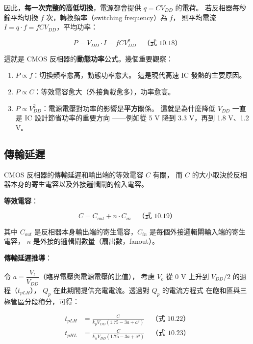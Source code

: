 \documentclass[12pt]{article}
\begin{document}
因此，\textbf{每一次完整的高低切換}，電源都會提供 $q = CV_{DD}$ 的電荷。
若反相器每秒鐘平均切換 $f$ 次，轉換頻率（switching frequency）為 $f$，
則平均電流 $I = q \cdot f = fCV_{DD}$，平均功率：

\begin{formulabox}
\[
  P = V_{DD} \cdot I = fCV_{DD}^2 \quad\text{（式 10.18）}
\]
\end{formulabox}

這就是 CMOS 反相器的\textbf{動態功率}公式。幾個重要觀察：

\begin{enumerate}[leftmargin=2.2em,itemsep=2pt]
  \item $P \propto f$：切換頻率愈高，動態功率愈大。
    這是現代高速 IC 發熱的主要原因。
  \item $P \propto C$：等效電容愈大（外接負載愈多），功率愈高。
  \item $P \propto V_{DD}^2$：電源電壓對功率的影響是\textbf{平方}關係。
    這就是為什麼降低 $V_{DD}$ 一直是 IC 設計節省功率的重要方向
    ——例如從 5 V 降到 3.3 V，再到 1.8 V、1.2 V。
\end{enumerate}

\subsection*{傳輸延遲}


CMOS 反相器的傳輸延遲和輸出端的等效電容 $C$ 有關，
而 $C$ 的大小取決於反相器本身的寄生電容以及外接邏輯閘的輸入電容。

\textbf{等效電容}：
\begin{formulabox}
\[
  C = C_{out} + n \cdot C_{in} \quad\text{（式 10.19）}
\]
\end{formulabox}
其中 $C_{out}$ 是反相器本身輸出端的寄生電容，$C_{in}$ 是每個外接邏輯閘輸入端的寄生電容，
$n$ 是外接的邏輯閘數量（扇出數，fanout）。

\textbf{傳輸延遲推導}：

令 $a = \dfrac{V_t}{V_{DD}}$（臨界電壓與電源電壓的比值），
考慮 $V_o$ 從 $0$ V 上升到 $V_{DD}/2$ 的過程（$t_{pLH}$），
$Q_p$ 在此期間提供充電電流。透過對 $Q_p$ 的電流方程式
在飽和區與三極管區分段積分，可得：

\begin{formulabox}
\begin{align*}
  t_{pLH} &= \frac{C}{k_p V_{DD} (1.75 - 3a + a^2)} \quad\text{（式 10.22）} \\[6pt]
  t_{pHL} &= \frac{C}{k_n V_{DD} (1.75 - 3a + a^2)} \quad\text{（式 10.23）}
\end{align*}
\end{formulabox}
\end{document}
